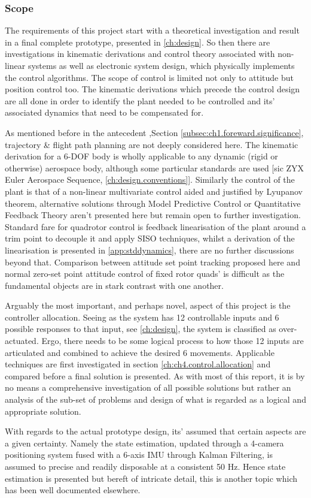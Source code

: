 \subsubsection{Scope}
\label{subsubsec:ch1.foreward.scope}
The requirements of this project start with a theoretical investigation and result in a final complete prototype, presented in \ref{ch:design}. So then there are investigations in kinematic derivations and control theory associated with non-linear systems as well as electronic system design, which physically implements the control algorithms. The scope of control is limited not only to attitude but position control too. The kinematic derivations which precede the control design are all done in order to identify the plant needed to be controlled and its' associated dynamics that need to be compensated for.
\par
As mentioned before in the antecedent ,Section \ref{subsec:ch1.foreward.significance}, trajectory \& flight path planning are not deeply considered here. The kinematic derivation for a 6-DOF body is wholly applicable to any dynamic (rigid or otherwise) aerospace body, although some particular standards are used [sic ZYX Euler Aerospace Sequence, \ref{ch:design.conventions}]. Similarly the control of the plant is that of a non-linear multivariate control aided and justified by Lyupanov theorem, alternative solutions through Model Predictive Control or Quantitative Feedback Theory aren't presented here but remain open to further investigation. Standard fare for quadrotor control is feedback linearisation of the plant around a trim point to decouple it and apply SISO techniques, whilst a derivation of the linearisation is presented in \ref{app:stddynamics}, there are no further discussions beyond that. Comparison between attitude set point tracking proposed here and normal zero-set point attitude control of fixed rotor quads' is difficult as the fundamental objects are in stark contrast with one another.
\par
Arguably the most important, and perhaps novel, aspect of this project is the controller allocation. Seeing as the system has 12 controllable inputs and 6 possible responses to that input, see \ref{ch:design}, the system is classified as over-actuated. Ergo, there needs to be some logical process to how those 12 inputs are articulated and combined to achieve the desired 6 movements. Applicable techniques are first investigated in section \ref{ch:ch4.control.allocation} and compared before a final solution is presented. As with most of this report, it is by no means a comprehensive investigation of all possible solutions but rather an analysis of the sub-set of problems and design of what is regarded as a logical and appropriate solution.
\par
With regards to the actual prototype design, its' assumed that certain aspects are a given certainty. Namely the state estimation, updated through a 4-camera positioning system fused with a 6-axis IMU through Kalman Filtering, is assumed to precise and readily disposable at a consistent 50 Hz. Hence state estimation is presented but bereft of intricate detail, this is another topic which has been well documented elsewhere.
